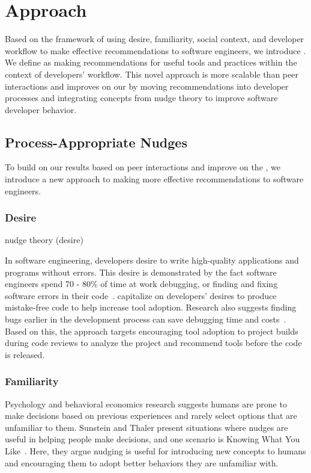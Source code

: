 \section{Approach}

Based on the framework of using desire, familiarity, social context, and developer workflow to make effective recommendations to software engineers, we introduce \process. We define \process as making recommendations for useful tools and practices within the context of developers' workflow. This novel approach is more scalable than peer interactions and improves on our \tele by moving recommendations into developer processes and integrating concepts from nudge theory to improve software developer behavior.

\subsection{Process-Appropriate Nudges}

To build on our results based on peer interactions and improve on the \tele, we introduce a new approach to making more effective recommendations to software engineers.

\subsubsection{Desire}

nudge theory (desire)

In software engineering, developers desire to write high-quality applications and programs without errors. This desire is demonstrated by the fact software engineers spend 70 - 80\% of time at work debugging, or finding and fixing software errors in their code~\cite{NIST}. \process capitalize on developers' desires to produce mistake-free code to help increase tool adoption. Research also suggests finding bugs earlier in the development process can save debugging time and costs~\cite{SEEconomics,Williams2007FaultFixTime}. Based on this, the \process approach targets encouraging tool adoption to project builds during code reviews to analyze the project and recommend tools before the code is released.

\subsubsection{Familiarity}

Psychology and behavioral economics research suggests humans are prone to make decisions based on previous experiences and rarely select options that are unfamiliar to them. Sunstein and Thaler present situations where nudges are useful in helping people make decisions, and one scenario is Knowing What You Like~\cite[p.~74-82]{sunstein2008nudge}. Here, they argue nudging is useful for introducing new concepts to humans and encouraging them to adopt better behaviors they are unfamiliar with. 


